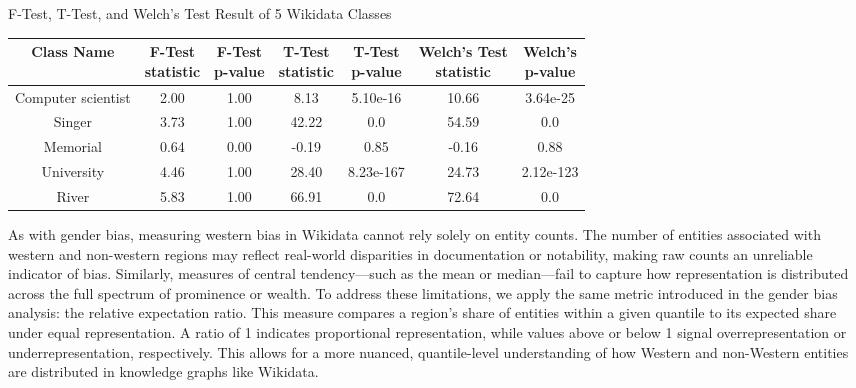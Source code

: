 \begin{center}
\scriptsize
\begin{threeparttable}
\captionsetup{font=small}
\caption{F-Test, T-Test, and Welch's Test Result of 5 Wikidata Classes}
\label{tab:western - mean test}
\begin{tabular}{c | c c c c c c} 
\toprule
    Class Name & \CellWithForceBreak{F-Test \\ statistic} & \CellWithForceBreak{F-Test \\ p-value} & \CellWithForceBreak{T-Test \\ statistic} & \CellWithForceBreak{T-Test \\ p-value} & \CellWithForceBreak{Welch's Test \\ statistic} & \CellWithForceBreak{Welch's \\ p-value} \\ [0.5ex] 
\midrule
    Computer scientist & 2.00 & 1.00 & 8.13 & 5.10e-16 & 10.66 & 3.64e-25 \\
    Singer & 3.73 & 1.00 & 42.22 & 0.0 & 54.59 & 0.0 \\
    Memorial & 0.64 & 0.00 & -0.19 & 0.85 & -0.16 & 0.88 \\
    University & 4.46 & 1.00 & 28.40 & 8.23e-167 & 24.73 & 2.12e-123 \\
    River & 5.83 & 1.00 & 66.91 & 0.0 & 72.64 & 0.0 \\
 [1ex]
\bottomrule
\end{tabular}
\begin{tablenotes}
    \scriptsize
    \item{}
\end{tablenotes}
\end{threeparttable}
\end{center}

As with gender bias, measuring western bias in Wikidata cannot rely solely on entity counts. The number of entities associated with western and non-western regions may reflect real-world disparities in documentation or notability, making raw counts an unreliable indicator of bias. Similarly, measures of central tendency—such as the mean or median—fail to capture how representation is distributed across the full spectrum of prominence or wealth. To address these limitations, we apply the same metric introduced in the gender bias analysis: the relative expectation ratio. This measure compares a region’s share of entities within a given quantile to its expected share under equal representation. A ratio of 1 indicates proportional representation, while values above or below 1 signal overrepresentation or underrepresentation, respectively. This allows for a more nuanced, quantile-level understanding of how Western and non-Western entities are distributed in knowledge graphs like Wikidata.


